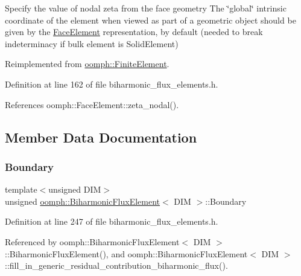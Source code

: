 Specify the value of nodal zeta from the face geometry The \char`\"{}global\char`\"{} intrinsic coordinate of the element when viewed as part of a geometric object should be given by the \hyperlink{classoomph_1_1FaceElement}{Face\+Element} representation, by default (needed to break indeterminacy if bulk element is Solid\+Element) 



Reimplemented from \hyperlink{classoomph_1_1FiniteElement_a849561c5fbcbc07dc49d2dc6cca68559}{oomph\+::\+Finite\+Element}.



Definition at line 162 of file biharmonic\+\_\+flux\+\_\+elements.\+h.



References oomph\+::\+Face\+Element\+::zeta\+\_\+nodal().



\subsection{Member Data Documentation}
\mbox{\label{classoomph_1_1BiharmonicFluxElement_a2e4afe98366a4354452fa94e79513218}} 
\subsubsection{\texorpdfstring{Boundary}{Boundary}}
{\footnotesize\ttfamily template$<$unsigned D\+IM$>$ \\
unsigned \hyperlink{classoomph_1_1BiharmonicFluxElement}{oomph\+::\+Biharmonic\+Flux\+Element}$<$ D\+IM $>$\+::Boundary\hspace{0.3cm}{\ttfamily [private]}}



Definition at line 247 of file biharmonic\+\_\+flux\+\_\+elements.\+h.



Referenced by oomph\+::\+Biharmonic\+Flux\+Element$<$ D\+I\+M $>$\+::\+Biharmonic\+Flux\+Element(), and oomph\+::\+Biharmonic\+Flux\+Element$<$ D\+I\+M $>$\+::fill\+\_\+in\+\_\+generic\+\_\+residual\+\_\+contribution\+\_\+biharmonic\+\_\+flux().

\mbox{\label{classoomph_1_1BiharmonicFluxElement_aaf5d92538756910dfc6391f3fc9ffa7b}} 
